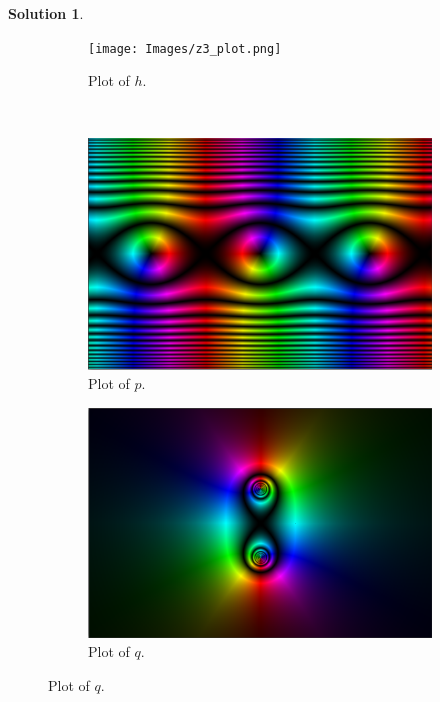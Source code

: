 \documentclass[12pt]{report} %
\theoremstyle{definition}
\newtheorem{solution}{Solution}
\begin{document}
\begin{solution}
\begin{figure}[H]
    \begin{subfigure}[h]{0.45\textwidth}
        \texttt{[image: Images/z3\_plot.png]}
        \caption{Plot of $h$.}
    \end{subfigure}
    ~
    \begin{subfigure}[h]{0.45\textwidth}
        \includegraphics[width=\textwidth]{Images/sinz_plot.png}
        \caption{Plot of $p$.}
    \end{subfigure}
    
    \begin{subfigure}[h]{0.45\textwidth}
        \includegraphics[width=\textwidth]{Images/rationalz_plot.png}
        \caption{Plot of $q$.}
    \end{subfigure}
\end{figure}
\end{solution}
\end{document}
